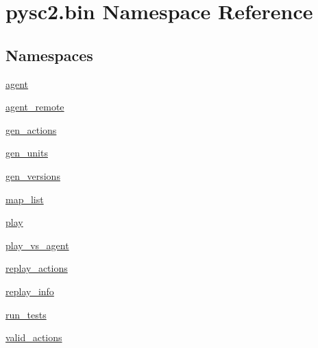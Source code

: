 \hypertarget{namespacepysc2_1_1bin}{}\section{pysc2.\+bin Namespace Reference}
\label{namespacepysc2_1_1bin}
\subsection*{Namespaces}
\begin{DoxyCompactItemize}
\item 
 \mbox{\hyperlink{namespacepysc2_1_1bin_1_1agent}{agent}}
\item 
 \mbox{\hyperlink{namespacepysc2_1_1bin_1_1agent__remote}{agent\+\_\+remote}}
\item 
 \mbox{\hyperlink{namespacepysc2_1_1bin_1_1gen__actions}{gen\+\_\+actions}}
\item 
 \mbox{\hyperlink{namespacepysc2_1_1bin_1_1gen__units}{gen\+\_\+units}}
\item 
 \mbox{\hyperlink{namespacepysc2_1_1bin_1_1gen__versions}{gen\+\_\+versions}}
\item 
 \mbox{\hyperlink{namespacepysc2_1_1bin_1_1map__list}{map\+\_\+list}}
\item 
 \mbox{\hyperlink{namespacepysc2_1_1bin_1_1play}{play}}
\item 
 \mbox{\hyperlink{namespacepysc2_1_1bin_1_1play__vs__agent}{play\+\_\+vs\+\_\+agent}}
\item 
 \mbox{\hyperlink{namespacepysc2_1_1bin_1_1replay__actions}{replay\+\_\+actions}}
\item 
 \mbox{\hyperlink{namespacepysc2_1_1bin_1_1replay__info}{replay\+\_\+info}}
\item 
 \mbox{\hyperlink{namespacepysc2_1_1bin_1_1run__tests}{run\+\_\+tests}}
\item 
 \mbox{\hyperlink{namespacepysc2_1_1bin_1_1valid__actions}{valid\+\_\+actions}}
\end{DoxyCompactItemize}
